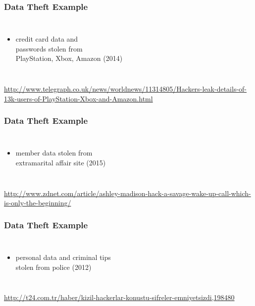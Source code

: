 \documentclass[dvipsnames]{beamer}
\theoremstyle{plain}
\begin{document}
\begin{frame}
  \frametitle{Data Theft Example}

  \begin{columns}

    \begin{itemize}
      \item credit card data and\\
        passwords stolen from\\
        PlayStation, Xbox, Amazon (2014)
    \end{itemize}
  \end{columns}

  \medskip
  \tiny{\url{http://www.telegraph.co.uk/news/worldnews/11314805/Hackers-leak-details-of-13k-users-of-PlayStation-Xbox-and-Amazon.html}}\\
\end{frame}

\begin{frame}
  \frametitle{Data Theft Example}

  \begin{columns}

    \begin{itemize}
      \item member data stolen from\\
        extramarital affair site (2015)
    \end{itemize}
  \end{columns}

  \medskip
  \tiny{\url{http://www.zdnet.com/article/ashley-madison-hack-a-savage-wake-up-call-which-is-only-the-beginning/}}\\
\end{frame}

\begin{frame}
  \frametitle{Data Theft Example}

  \begin{columns}

    \begin{itemize}
      \item personal data and criminal tips\\
        stolen from police (2012)
    \end{itemize}
  \end{columns}

  \medskip
  \tiny{\url{http://t24.com.tr/haber/kizil-hackerlar-konustu-sifreler-emniyetsizdi,198480}}\\
\end{frame}
\end{document}
